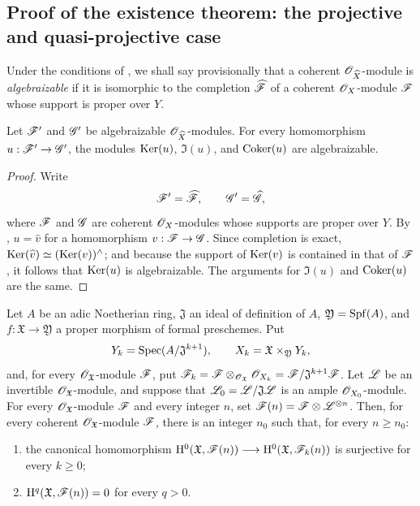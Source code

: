 \subsection{Proof of the existence theorem: the projective and quasi-projective case}
\label{subsection:III.5.2}

\begin{env}[5.2.1]
\label{III.5.2.1}
Under the conditions of , we shall say
provisionally that a coherent $\mathscr{O}_{\widehat{X}}$-module is
\emph{algebraizable} if it is isomorphic to the completion
$\widehat{\mathscr{F}}$ of a coherent $\mathscr{O}_X$-module $\mathscr{F}$ whose
support is proper over $Y$.
\end{env}

\begin{lemma}[5.2.2]
\label{III.5.2.2}
Let $\mathscr{F}'$ and $\mathscr{G}'$ be algebraizable
$\mathscr{O}_{\widehat{X}}$-modules.  For every homomorphism
$u:\mathscr{F}'\to\mathscr{G}'$, the modules
$\operatorname{Ker}(u)$, $\Im(u)$, and $\operatorname{Coker}(u)$ are algebraizable.
\end{lemma}

\begin{proof}
Write
\[
  \mathscr{F}'=\widehat{\mathscr{F}},\qquad
  \mathscr{G}'=\widehat{\mathscr{G}},
\]
where $\mathscr{F}$ and $\mathscr{G}$ are coherent $\mathscr{O}_X$-modules whose
supports are proper over $Y$.  By ,
$u=\widehat{v}$ for a homomorphism
$v:\mathscr{F}\to\mathscr{G}$.  Since completion is exact,
$\operatorname{Ker}(\widehat{v})\simeq(\operatorname{Ker}(v))^{\wedge}$; and because the support
of $\operatorname{Ker}(v)$ is contained in that of $\mathscr{F}$, it follows that
$\operatorname{Ker}(u)$ is algebraizable.  The arguments for $\Im(u)$ and
$\operatorname{Coker}(u)$ are the same.
\end{proof}

\begin{proposition}[5.2.3]
\label{III.5.2.3}
Let $A$ be an adic Noetherian ring, $\mathfrak{J}$ an ideal of
definition of $A$, $\mathfrak{Y}=\operatorname{Spf}(A)$, and
$f:\mathfrak{X}\to\mathfrak{Y}$ a proper morphism of formal
preschemes.  Put
\[
  Y_k=\operatorname{Spec}(A/\mathfrak{J}^{k+1}),\qquad
  X_k=\mathfrak{X}\times_{\mathfrak{Y}}Y_k,
\]
and, for every $\mathscr{O}_{\mathfrak{X}}$-module $\mathscr{F}$, put $\mathscr{F}_k
=
\mathscr{F}\otimes_{\mathscr{O}_{\mathfrak{X}}}\mathscr{O}_{X_k}
=
\mathscr{F}/\mathfrak{J}^{k+1}\mathscr{F}$.
Let $\mathscr{L}$ be an invertible $\mathscr{O}_{\mathfrak{X}}$-module, and
suppose that
$\mathscr{L}_0=\mathscr{L}/\mathfrak{J}\mathscr{L}$ is an ample
$\mathscr{O}_{X_0}$-module.  For every
$\mathscr{O}_{\mathfrak{X}}$-module $\mathscr{F}$ and every integer $n$, set $\mathscr{F}(n)=\mathscr{F}\otimes\mathscr{L}^{\otimes n}$.
Then, for every coherent $\mathscr{O}_{\mathfrak{X}}$-module $\mathscr{F}$,
there is an integer $n_0$ such that, for every $n\geq n_0$:
\begin{enumerate}
  \item[\rm{(i)}] the canonical homomorphism $\mathrm{H}^0(\mathfrak{X},\mathscr{F}(n))
\longrightarrow
\mathrm{H}^0(\mathfrak{X},\mathscr{F}_k(n))$
    is surjective for every $k\geq0$;
  \item[\rm{(ii)}]
    $\mathrm{H}^q(\mathfrak{X},\mathscr{F}(n))=0$ for every $q>0$.
\end{enumerate}
\end{proposition}

